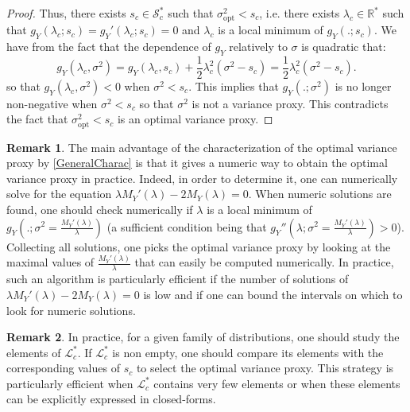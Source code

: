 \documentclass[a4paper, 10pt]{article}
\newcommand{\beq}{\begin{equation}}
\newcommand{\eeq}{\end{equation}}
\theoremstyle{definition}
\newtheorem{remark}{Remark}[section]
\begin{document}
\begin{proof}
\medskip

 Thus, there exists $s_c\in \mathcal{S}_c^*$ such that $\sigma_{\mathrm{opt}}^2<s_c$, i.e. there exists $\lambda_c\in \mathbb{R}^*$ such that $g_Y(\lambda_c;s_c)=g_Y'(\lambda_c;s_c)=0$ and $\lambda_c$ is a local minimum of $g_Y(.;s_c)$. We have from the fact that the dependence of $g_Y$ relatively to $\sigma$ is quadratic that:
\beq g_Y(\lambda_c,\sigma^2)=g_Y(\lambda_c,s_c) +\frac{1}{2}\lambda_c^2 (\sigma^2-s_c)=\frac{1}{2}\lambda_c^2 (\sigma^2-s_c).\eeq
so that $g_Y(\lambda_c,\sigma^2)<0$ when $\sigma^2<s_c$. This implies that $g_Y(.;\sigma^2)$ is no longer non-negative when $\sigma^2<s_c$ so that $\sigma^2$ is not a variance proxy. This contradicts the fact that $\sigma_{\mathrm{opt}}^2<s_c$ is an optimal variance proxy.
\end{proof}


\begin{remark}The main advantage of the characterization of the optimal variance proxy by \autoref{GeneralCharac} is that it gives a numeric way to obtain the optimal variance proxy in practice. Indeed, in order to determine it, one can numerically solve for the equation $\lambda M_Y'(\lambda)-2M_Y(\lambda)=0$. When numeric solutions are found, one should check numerically if $\lambda$ is a local minimum of $g_Y\left(.;\sigma^2=\frac{M_Y'(\lambda)}{\lambda}\right)$ (a sufficient condition being that $g_Y''\left(\lambda;\sigma^2=\frac{M_Y'(\lambda)}{\lambda}\right)>0$). Collecting all solutions, one picks the optimal variance proxy by looking at the maximal values of $\frac{M_Y'(\lambda)}{\lambda}$ that can easily be computed numerically. In practice, such an algorithm is particularly efficient if the number of solutions of $\lambda M_Y'(\lambda)-2M_Y(\lambda)=0$ is low and if one can bound the intervals on which to look for numeric solutions.  
\end{remark}


\begin{remark}
In practice, for a given family of distributions, one should study the elements of $\mathcal{L}_c^*$. If $\mathcal{L}_c^*$ is non empty, one should compare its elements with the corresponding values of $s_c$ to select the optimal variance proxy. This strategy is particularly efficient when $\mathcal{L}_c^*$ contains very few elements or when these elements can be explicitly expressed in closed-forms.
\end{remark}
\end{document}
